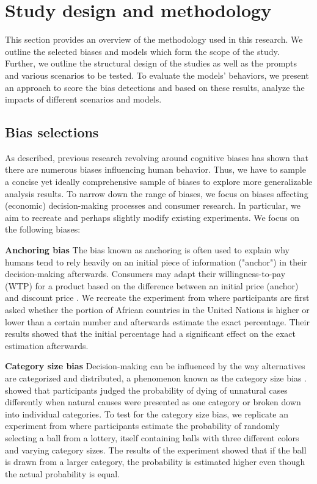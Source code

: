 \section{Study design and methodology}
\par This section provides an overview of the methodology used in this research. We outline the selected biases and models which form the scope of the study. Further, we outline the structural design of the studies as well as the prompts and various scenarios to be tested. To evaluate the models' behaviors, we present an approach to score the bias detections and based on these results, analyze the impacts of different scenarios and models.


\subsection{Bias selections}
\par As described, previous research revolving around cognitive biases has shown that there are numerous biases influencing human behavior. Thus, we have to sample a concise yet ideally comprehensive sample of biases to explore more generalizable analysis results. To narrow down the range of biases, we focus on biases affecting (economic) decision-making processes and consumer research. In particular, we aim to recreate and perhaps slightly modify existing experiments. We focus on the following biases:

\setlength{\parindent}{20pt}
\par \textbf{Anchoring bias} The bias known as anchoring is often used to explain why humans tend to rely heavily on an initial piece of information ("anchor") in their decision-making afterwards. Consumers may adapt their willingness-to-pay (WTP) for a product based on the difference between an initial price (anchor) and discount price \parencite{chandrashekaran2006anchoring}. We recreate the experiment from \textcite{tversky1974judgment} where participants are first asked whether the portion of African countries in the United Nations is higher or lower than a certain number and afterwards estimate the exact percentage. Their results showed that the initial percentage had a significant effect on the exact estimation afterwards.

\par \textbf{Category size bias} Decision-making can be influenced by the way alternatives are categorized and distributed, a phenomenon known as the category size bias \parencite{isaac2014judging}. \textcite{tversky1994support} showed that participants judged the probability of dying of unnatural cases differently when natural causes were presented as one category or broken down into individual categories. To test for the category size bias, we replicate an experiment from \textcite{isaac2014judging} where participants estimate the probability of randomly selecting a ball from a lottery, itself containing balls with three different colors and varying category sizes. The results of the experiment showed that if the ball is drawn from a larger category, the probability is estimated higher even though the actual probability is equal.

